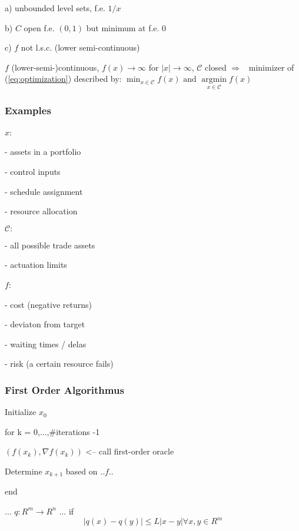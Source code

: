 a) unbounded level sets, f.e. $1/x$

b) $C$ open f.e. $(0,1)$ but minimum at f.e. $0$

c) $f$ not l.s.c. (lower semi-continuous)

%
\begin{proposition}
	$f$ (lower-semi-)continuous,
	$f(x)\rightarrow\infty$ for $|x|\rightarrow\infty$,
	$\mathcal{C}$ closed
	$\Rightarrow$ \exists\ minimizer of (\ref{eq:optimization}) described by:
	$
		\min_{x \in \mathcal{C}} f(x) \text{\ and\ } \underset{x \in \mathcal{C}}{\operatorname{argmin}} f(x) %
	$
\end{proposition}


\subsubsection{Examples}

$x$:

- assets in a portfolio

- control inputs

- schedule assignment

- resource allocation

$\mathcal{C}:$

- all possible trade assets

- actuation limits

$f$:

- cost (negative returns)

- deviaton from target

- waiting times / delas

- risk (a certain resource fails)

\subsubsection{First Order Algorithmus}

Initialize $x_0$

for k = 0,...,\#iterations -1

$(f(x_k),\nabla f(x_k))$ <-- call first-order oracle

Determine $x_{k+1}$ based on ${..f..}$

end

\begin{definition}
	... $q: R^m \rightarrow R^n$ ... if
	$$|q(x)-q(y)| \le L |x-y| \forall x,y \in R^m$$
\end{definition}


